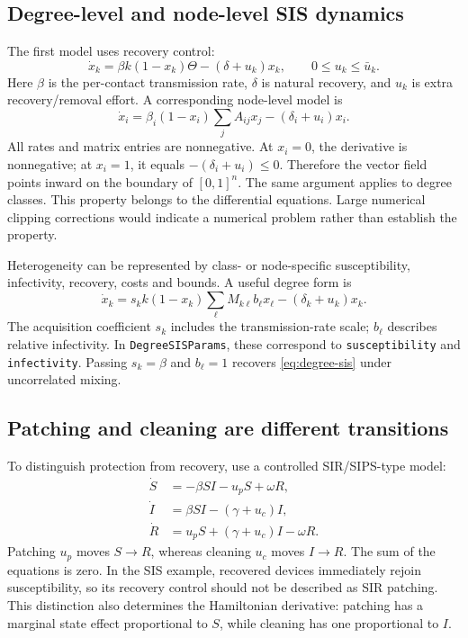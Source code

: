 \documentclass[11pt,a4paper]{article}
\theoremstyle{definition}
\theoremstyle{remark}
\begin{document}
\subsection{Degree-level and node-level SIS dynamics}
The first model uses recovery control:
\begin{equation}
\dot x_k=\beta k(1-x_k)\Theta-(\delta+u_k)x_k,
\qquad 0\le u_k\le\bar u_k.
\label{eq:degree-sis}
\end{equation}
Here $\beta$ is the per-contact transmission rate, $\delta$ is natural recovery, and $u_k$ is extra recovery/removal effort. A corresponding node-level model is
\begin{equation}
\dot x_i=\beta_i(1-x_i)\sum_j A_{ij}x_j-(\delta_i+u_i)x_i.
\label{eq:node-sis}
\end{equation}
All rates and matrix entries are nonnegative. At $x_i=0$, the derivative is nonnegative; at $x_i=1$, it equals $-(\delta_i+u_i)\le0$. Therefore the vector field points inward on the boundary of $[0,1]^n$. The same argument applies to degree classes. This property belongs to the differential equations. Large numerical clipping corrections would indicate a numerical problem rather than establish the property.

Heterogeneity can be represented by class- or node-specific susceptibility, infectivity, recovery, costs and bounds. A useful degree form is
\begin{equation}
\dot x_k=s_k k(1-x_k)\sum_\ell M_{k\ell}b_\ell x_\ell
 -(\delta_k+u_k)x_k.
\label{eq:heterogeneous-degree}
\end{equation}
The acquisition coefficient $s_k$ includes the transmission-rate scale; $b_\ell$ describes relative infectivity. In \texttt{DegreeSISParams}, these correspond to \texttt{susceptibility} and \texttt{infectivity}. Passing $s_k=\beta$ and $b_\ell=1$ recovers \eqref{eq:degree-sis} under uncorrelated mixing.

\subsection{Patching and cleaning are different transitions}
To distinguish protection from recovery, use a controlled SIR/SIPS-type model:
\begin{align}
\dot S&=-\beta SI-u_pS+\omega R,\nonumber\\
\dot I&=\beta SI-(\gamma+u_c)I,\label{eq:patch-clean}\\
\dot R&=u_pS+(\gamma+u_c)I-\omega R.\nonumber
\end{align}
Patching $u_p$ moves $S\to R$, whereas cleaning $u_c$ moves $I\to R$. The sum of the equations is zero. In the SIS example, recovered devices immediately rejoin susceptibility, so its recovery control should not be described as SIR patching. This distinction also determines the Hamiltonian derivative: patching has a marginal state effect proportional to $S$, while cleaning has one proportional to $I$.
\end{document}
